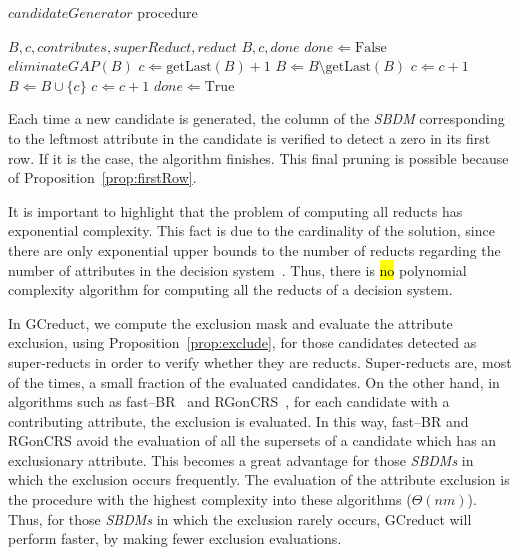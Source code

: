 \documentclass[number,preprint,review,12pt]{elsarticle}
\begin{document}
	\begin{algorithm}
		\footnotesize
		\caption{$candidateGenerator$ procedure}
		\label{alg:CandGenerator}
		\begin{algorithmic}[1]
			\Require \textit{$B,c,contributes,superReduct,reduct$}
			\Ensure $B,c,done$ 
			\State $done \Leftarrow \mathrm{False}$
			\label{line:cg} 
			\label{line:gap} 
			\State $eliminateGAP(B)$
			\EndIf
			\State $c \Leftarrow  \mathrm{getLast}(B)+1$
			\State $B \Leftarrow B\setminus \mathrm{getLast}(B)$\label{line:remLast}
			\Else
			\label{line:NCorSR}
			\State $c \Leftarrow c+1$\label{line:replaceC} 
			\Else
			\State $B \Leftarrow B\cup \lbrace c\rbrace$\label{line:add1} 
			\State $c \Leftarrow c+1$\label{line:add1End} 
			\EndIf
			\EndIf
			 \label{line:done}
			\State $done \Leftarrow \mathrm{True}$
			\EndIf
		\end{algorithmic}
	\end{algorithm}
	
	Each time a new candidate is generated, the column of the \textit{SBDM} corresponding to the leftmost attribute in the candidate is verified to detect a zero in its first row. If it is the case, the algorithm finishes. This final pruning is possible because of Proposition~\ref{prop:firstRow}.
		
	It is important to highlight that the problem of computing all reducts has exponential complexity. This fact is due to the cardinality of the solution, since there are only exponential upper bounds to the number of reducts regarding the number of attributes in the decision system~\cite{Skowron92}. Thus, there is \hl{no} polynomial complexity algorithm for computing all the reducts of a decision system. %
	
	\label{par:complexity}
	In GCreduct, we compute the exclusion mask and evaluate the attribute exclusion, using Proposition~\ref{prop:exclude}, for those candidates detected as super-reducts in order to verify whether they are reducts. Super-reducts are, most of the times, a small fraction of the evaluated candidates. On the other hand, in algorithms such as fast--BR~\cite{Lias13} and RGonCRS~\cite{WangP07}, for each candidate with a contributing attribute, the exclusion is evaluated. In this way, fast--BR and RGonCRS avoid the evaluation of all the supersets of a candidate which has an exclusionary attribute. This becomes a great advantage for those \textit{SBDMs} in which the exclusion occurs frequently. The evaluation of the attribute exclusion is the procedure with the highest complexity into these algorithms ($\Theta (nm)$). Thus, for those \textit{SBDMs} in which the exclusion rarely occurs, GCreduct will perform faster, by making fewer exclusion evaluations.
	
\end{document}

